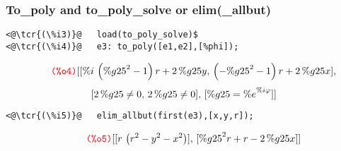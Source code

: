 \documentclass[../Maxima_Workbook.tex]{subfiles}
\begin{document}
\subsubsection{To\_poly and to\_poly\_solve or elim(\_allbut)}

\begin{small}
\color{blue} \leqn
\begin{lstlisting}
<@\tcr{(\%i3)}@   load(to_poly_solve)$
<@\tcr{(\%i4)}@   e3: to_poly([e1,e2],[%phi]); 
\end{lstlisting}
\vspace{-4mm} \[\tag*{\tcr{\ttfamily (\%o4)}} [[\% i \, \left( {{\% g25}^{2}}-1\right)  r +2 \, \% g25 y, \, \left( -{{\% g25}^{2}}-1\right)  r +2 \, \% g25 x], \]
\vspace{-8mm} \[ [2 \, \% g25 \neq 0, \, 2 \, \% g25 \neq 0], \, [\% g25 ={{\% e}^{\% i \varphi }}]] \]
\vspace{-6mm} \begin{lstlisting}
<@\tcr{(\%i5)}@   elim_allbut(first(e3),[x,y,r]);
\end{lstlisting}
\vspace{-4mm} \[\tag*{\tcr{\ttfamily (\%o5)}} [[r \, \left( {{r }^{2}}-{{y}^{2}}-{{x}^{2}}\right) ], \, [{{\% g25}^{2}} r + r -2 \, \% g25 x]] \]
\color{black} \reqn
\end{small} \vspace{-4mm}
\end{document}
